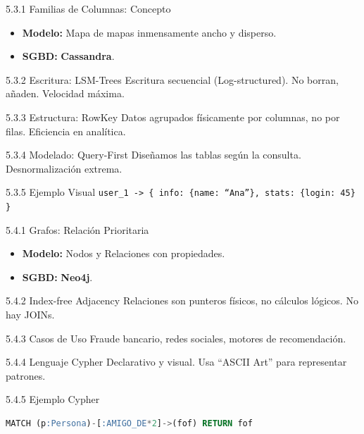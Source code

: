 \begin{frame}{5.3.1 Familias de Columnas: Concepto}
    \begin{itemize}
        \item \textbf{Modelo:} Mapa de mapas inmensamente ancho y disperso.
        \item \textbf{SGBD:} \textbf{Cassandra}.
    \end{itemize}
\end{frame}
\begin{frame}{5.3.2 Escritura: LSM-Trees}
    Escritura secuencial (Log-structured). No borran, añaden. Velocidad máxima.
\end{frame}
\begin{frame}{5.3.3 Estructura: RowKey}
    Datos agrupados físicamente por columnas, no por filas. Eficiencia en analítica.
\end{frame}
\begin{frame}{5.3.4 Modelado: Query-First}
    Diseñamos las tablas según la consulta. Desnormalización extrema.
\end{frame}
\begin{frame}[fragile]{5.3.5 Ejemplo Visual}
    \texttt{user\_1 -> \{ info: \{name: ``Ana''\}, stats: \{login: 45\} \}}
\end{frame}

\begin{frame}{5.4.1 Grafos: Relación Prioritaria}
    \begin{itemize}
        \item \textbf{Modelo:} Nodos y Relaciones con propiedades.
        \item \textbf{SGBD:} \textbf{Neo4j}.
    \end{itemize}
\end{frame}
\begin{frame}{5.4.2 Index-free Adjacency}
    Relaciones son punteros físicos, no cálculos lógicos. No hay JOINs.
\end{frame}
\begin{frame}{5.4.3 Casos de Uso}
    Fraude bancario, redes sociales, motores de recomendación.
\end{frame}
\begin{frame}{5.4.4 Lenguaje Cypher}
    Declarativo y visual. Usa ``ASCII Art'' para representar patrones.
\end{frame}
\begin{frame}[fragile]{5.4.5 Ejemplo Cypher}
    \begin{lstlisting}[language=SQL]
MATCH (p:Persona)-[:AMIGO_DE*2]->(fof) RETURN fof
    \end{lstlisting}
\end{frame}
